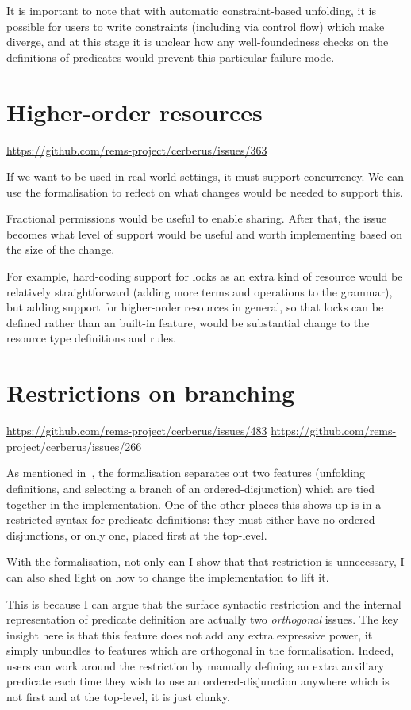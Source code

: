 It is important to note that with automatic constraint-based unfolding, it is
possible for users to write constraints (including via control flow) which make
 diverge, and at this stage it is unclear how any well-foundedness
checks on the definitions of predicates would prevent this particular failure
mode.

\section{Higher-order resources}
\url{https://github.com/rems-project/cerberus/issues/363}

If we want  to be used in real-world settings, it must support
concurrency. We can use the formalisation to reflect on what changes
would be needed to support this.

Fractional permissions would be useful to enable sharing. After that,
the issue becomes what level of support would be useful and worth implementing
based on the size of the change.

For example, hard-coding support for locks as an extra kind of resource would
be relatively straightforward (adding more terms and operations to the
grammar), but adding support for higher-order resources in general, so that
locks can be defined rather than an built-in feature, would be substantial
change to the resource type definitions and rules.

\section{Restrictions on branching}\label{sec:restriction-branching}
\url{https://github.com/rems-project/cerberus/issues/483}
\url{https://github.com/rems-project/cerberus/issues/266}

As mentioned in~, the formalisation
separates out two features (unfolding definitions, and selecting a branch of an
ordered-disjunction) which are tied together in the implementation. One of
the other places this shows up is in a restricted syntax for predicate definitions:
they must either have no ordered-disjunctions, or only one, placed first at the
top-level.

With the formalisation, not only can I show that that restriction is
unnecessary, I can also shed light on how to change the implementation to lift it.

This is because I can argue that the surface syntactic restriction and the
internal representation of predicate definition are actually two
\emph{orthogonal} issues. The key insight here is that this feature does not
add any extra expressive power, it simply unbundles to features which are
orthogonal in the formalisation. Indeed, users can work around the restriction
by manually defining an extra auxiliary predicate each time they wish to use an
ordered-disjunction anywhere which is not first and at the top-level, it is just
clunky.

